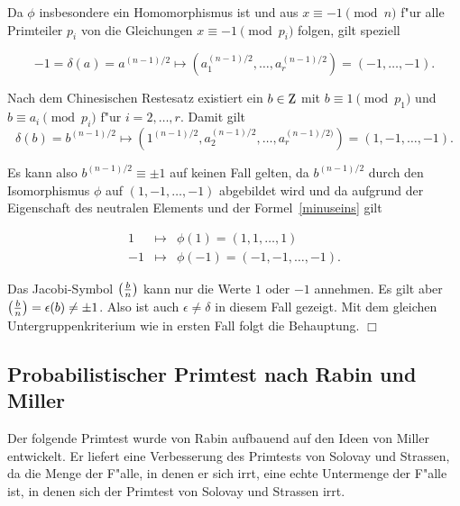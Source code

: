 \begin{enumerate}
      Da $\phi$ insbesondere ein Homomorphismus ist und aus $x \equiv
      -1 \pmod{n}$ f"ur alle Primteiler $p_i$ von die Gleichungen $x
      \equiv -1 \pmod{p_i}$ folgen, gilt speziell

      \begin{equation} 
         -1 = \delta(a) = a^{(n-1)/2} \mapsto 
         \left(a_1^{(n-1)/2},\ldots,a_r^{(n-1)/2}\right) = (-1,\ldots,-1). 
         \label{minuseins} 
      \end{equation}

      Nach dem Chinesischen Restesatz existiert ein $b\in\Z$ mit
      $b\equiv 1 \pmod{p_1}$ und $b\equiv a_i \pmod{p_i}$ f"ur
      $i=2,\ldots,r$. Damit gilt
      $$ \delta(b) = b^{(n-1)/2} \mapsto \left( 1^{(n-1)/2},
         a_2^{(n-1)/2},\ldots,a_r^{(n-1)/2)} \right) =
         (1,-1,\ldots, -1). $$

      Es kann also $b^{(n-1)/2} \equiv \pm 1$ auf keinen Fall gelten,
      da $b^{(n-1)/2}$ durch den Isomorphismus $\phi$ auf
      $(1,-1,\ldots,-1)$ abgebildet wird und da aufgrund der
      Eigenschaft des neutralen Elements und der
      Formel~\ref{minuseins} gilt

      \begin{eqnarray*}
         1 & \mapsto & \phi(1)  = (1,1,\ldots,1) \\
        -1 & \mapsto & \phi(-1) = (-1,-1,\ldots,-1).
      \end{eqnarray*}

      Das Jacobi-Symbol $\left(\frac{b}{n}\right)$ kann nur die Werte $1$ oder $-1$ annehmen. 
      Es gilt aber $\left(\frac{b}{n}\right)=\epsilon(b)\neq \pm 1$. Also ist auch 
      $\epsilon \neq \delta$ in diesem Fall gezeigt. Mit
      dem gleichen Untergruppenkriterium wie in ersten Fall folgt die
      Behauptung. \hfill $\Box$
\end{enumerate}


\subsection{Probabilistischer Primtest nach Rabin und Miller}

Der folgende Primtest wurde von Rabin aufbauend auf den
Ideen von Miller entwickelt. Er liefert eine Verbesserung des
Primtests von Solovay und Strassen, da die Menge der F"alle, in
denen er sich irrt, eine echte Untermenge der F"alle ist, in denen sich
der Primtest von Solovay und Strassen irrt.

